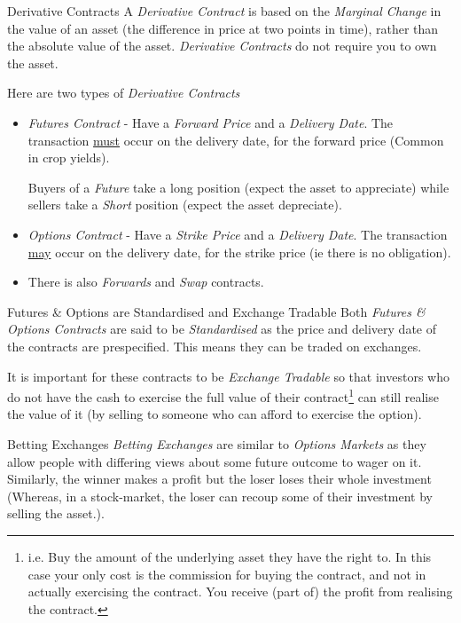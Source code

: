 \documentclass[11pt,a4paper]{article}
\begin{document}
  \begin{definition}{Derivative Contracts}
    A \textit{Derivative Contract} is based on the \textit{Marginal Change} in the value of an asset (the difference in price at two points in time), rather than the absolute value of the asset. \textit{Derivative Contracts} do not require you to own the asset.
    \par Here are two types of \textit{Derivative Contracts}
    \begin{itemize}
      \item \textit{Futures Contract} - Have a \textit{Forward Price} and a \textit{Delivery Date}. The transaction \underline{must} occur on the delivery date, for the forward price (Common in crop yields).
      \par Buyers of a \textit{Future} take a long position (expect the asset to appreciate) while sellers take a \textit{Short} position (expect the asset depreciate).
      \item \textit{Options Contract} - Have a \textit{Strike Price} and a \textit{Delivery Date}. The transaction \underline{may} occur on the delivery date, for the strike price (ie there is no obligation).
      \item There is also \textit{Forwards} and \textit{Swap} contracts.
    \end{itemize}
  \end{definition}

  \begin{remark}{Futures \& Options are Standardised and Exchange Tradable}
    Both \textit{Futures \& Options Contracts} are said to be \textit{Standardised} as the price and delivery date of the contracts are prespecified. This means they can be traded on exchanges.
    \par It is important for these contracts to be \textit{Exchange Tradable} so that investors who do not have the cash to exercise the full value of their contract\footnote{i.e. Buy the amount of the underlying asset they have the right to. In this case your only cost is the commission for buying the contract, and not in actually exercising the contract. You receive (part of) the profit from realising the contract. } can still realise the value of it (by selling to someone who can afford to exercise the option).
  \end{remark}

  \begin{remark}{Betting Exchanges}
    \textit{Betting Exchanges} are similar to \textit{Options Markets} as they allow people with differing views about some future outcome to wager on it. Similarly, the winner makes a profit but the loser loses their whole investment (Whereas, in a stock-market, the loser can recoup some of their investment by selling the asset.).
  \end{remark}
\end{document}
